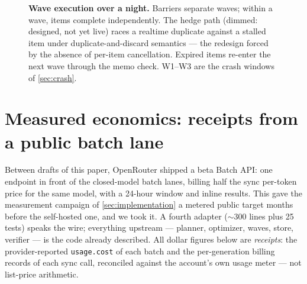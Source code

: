 \documentclass[11pt]{article}
\begin{document}
\begin{figure}[!htbp]
\centering

\caption{\textbf{Wave execution over a night.} Barriers separate waves; within a wave, items complete independently. The hedge path (dimmed: designed, not yet live) races a realtime duplicate against a stalled item under duplicate-and-discard semantics --- the redesign forced by the absence of per-item cancellation. Expired items re-enter the next wave through the memo check. W1--W3 are the crash windows of \cref{sec:crash}.}
\label{fig:wavetimeline}
\end{figure}


\section{Measured economics: receipts from a public batch lane}
\label{sec:measured}

Between drafts of this paper, OpenRouter shipped a beta Batch API: one
endpoint in front of the closed-model batch lanes, billing half the sync
per-token price for the same model, with a 24-hour window and inline
results. This gave the measurement campaign of
\cref{sec:implementation} a metered public target months before the
self-hosted one, and we took it. A fourth adapter ($\sim$300 lines
plus 25 tests) speaks the wire; everything upstream --- planner,
optimizer, waves, store, verifier --- is the code already described. All
dollar figures below are \emph{receipts}: the provider-reported
\texttt{usage.cost} of each batch and the per-generation billing records
of each sync call, reconciled against the account's own usage meter ---
not list-price arithmetic.
\end{document}
